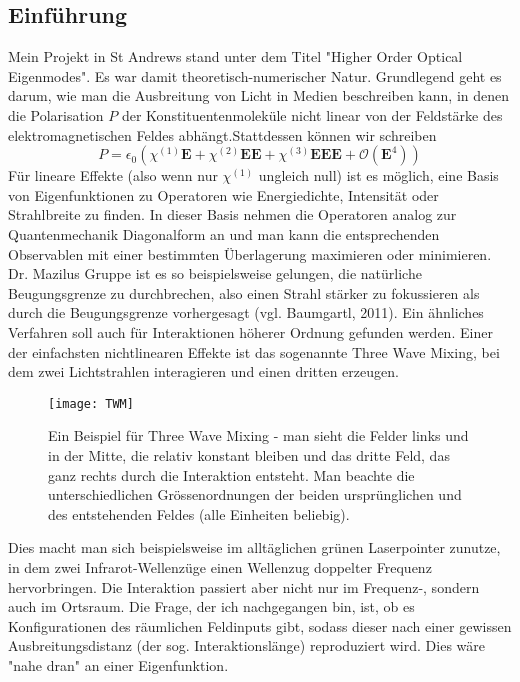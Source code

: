 \documentclass{article}
\begin{document}
\subsection{Einf\"{u}hrung}
Mein Projekt in St Andrews stand unter dem Titel "Higher Order Optical Eigenmodes". Es war damit theoretisch-numerischer Natur. Grundlegend geht es darum, wie man die Ausbreitung von Licht in Medien beschreiben kann, in denen die Polarisation $P$ der Konstituentenmolek\"{u}le nicht linear von der Feldst\"{a}rke des elektromagnetischen Feldes abh\"{a}ngt.Stattdessen k\"{o}nnen wir schreiben
\begin{equation}
P= \epsilon_0 (\chi^{(1)}\textbf{E}+\chi^{(2)}\textbf{EE}+ \chi^{(3)}\textbf{EEE}+\mathcal{O}(\textbf{E}^4))
\end{equation}
F\"{u}r lineare Effekte (also wenn nur $\chi^{(1)}$ ungleich null) ist es m\"{o}glich, eine Basis von Eigenfunktionen zu Operatoren wie Energiedichte, Intensit\"{a}t oder Strahlbreite zu finden. In dieser Basis nehmen die Operatoren analog zur Quantenmechanik Diagonalform an und man kann die entsprechenden Observablen mit einer bestimmten \"{U}berlagerung maximieren oder minimieren. Dr. Mazilus Gruppe ist es so beispielsweise gelungen, die nat\"{u}rliche Beugungsgrenze zu durchbrechen, also einen Strahl st\"{a}rker zu fokussieren als durch die Beugungsgrenze vorhergesagt (vgl. Baumgartl, 2011). Ein \"{a}hnliches Verfahren soll auch f\"{u}r Interaktionen h\"{o}herer Ordnung gefunden werden. Einer der einfachsten nichtlinearen Effekte ist das sogenannte Three Wave Mixing, bei dem zwei Lichtstrahlen interagieren und einen dritten erzeugen.
\begin{figure}[h]
\texttt{[image: TWM]}
\caption{Ein Beispiel f\"{u}r Three Wave Mixing - man sieht die Felder links und in der Mitte, die relativ konstant bleiben und das dritte Feld, das ganz rechts durch die Interaktion entsteht. Man beachte die unterschiedlichen Gr\"{o}ssenordnungen der beiden urspr\"{u}nglichen und des entstehenden Feldes (alle Einheiten beliebig).}
\end{figure}
Dies macht man sich beispielsweise im allt\"{a}glichen gr\"{u}nen Laserpointer zunutze, in dem zwei Infrarot-Wellenz\"{u}ge einen Wellenzug doppelter Frequenz hervorbringen. Die Interaktion passiert aber nicht nur im Frequenz-,
sondern \\ auch im Ortsraum. Die Frage, der ich nachgegangen bin, ist, ob es Konfigurationen des r\"{a}umlichen Feldinputs gibt, sodass dieser nach einer gewissen Ausbreitungsdistanz (der sog. Interaktionsl\"{a}nge) reproduziert wird. Dies w\"{a}re "nahe dran" an einer Eigenfunktion.
\end{document}

